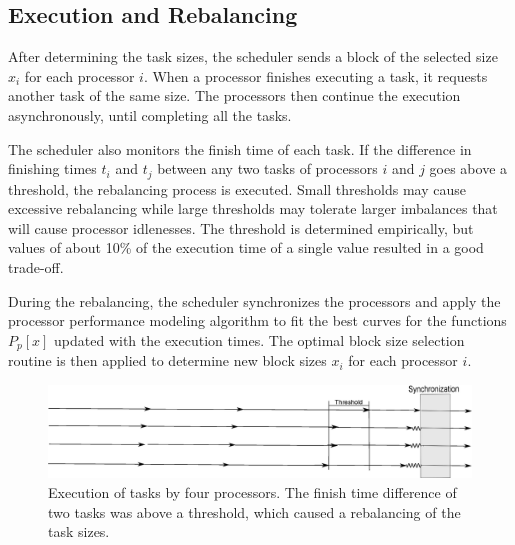 \documentclass[journal]{IEEEtran}
\begin{document}


\vspace{0.2cm}
\subsection{Execution and Rebalancing}
After determining the task sizes, the scheduler sends a block of the selected
size $x_i$ for each processor $i$. When a processor finishes executing a task,
it requests another task of the same size. The processors then continue the
execution asynchronously, until completing all the tasks.

The scheduler also monitors the finish time of each task. If the difference in
finishing times $t_i$ and $t_j$ between any two tasks of processors $i$ and $j$
goes above a threshold, the rebalancing process is executed. Small thresholds
may cause excessive rebalancing while large thresholds may tolerate larger
imbalances that will cause processor idlenesses. The threshold is determined
empirically, but values of about 10\% of the execution time of a single value
resulted in a good trade-off.


During the rebalancing, the scheduler synchronizes the processors and apply the
processor performance modeling algorithm to fit the best curves for the
functions $P_p[x]$ updated with the execution times. The optimal block size
selection routine is then applied to determine new block sizes $x_i$ for each
processor $i$.

\begin{figure}[!t]
	\centering
			\includegraphics[scale=0.24]{DiagramaArtigo.eps}
	\caption{Execution of tasks by four processors. The finish time
          difference of two tasks was above a threshold, which caused a
          rebalancing of the task sizes.}
	\label{fig:Diagrama}
\end{figure}
\end{document}
